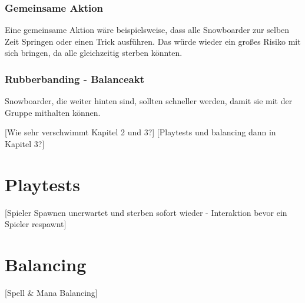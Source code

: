 \subsubsection{Gemeinsame Aktion}
Eine gemeinsame Aktion wäre beispielsweise, dass alle Snowboarder zur selben Zeit Springen oder einen Trick ausführen. Das würde wieder ein großes Risiko mit sich bringen, da alle gleichzeitig sterben könnten.

\subsubsection{Rubberbanding - Balanceakt}
Snowboarder, die weiter hinten sind, sollten schneller werden, damit sie mit der Gruppe mithalten können. 

[Wie sehr verschwimmt Kapitel 2 und 3?]
[Playtests und balancing dann in Kapitel 3?]

\section{Playtests}

[Spieler Spawnen unerwartet und sterben sofort wieder - Interaktion bevor ein Spieler respawnt]

\section{Balancing}

[Spell \& Mana Balancing]
